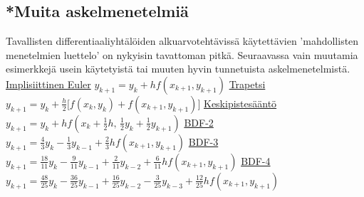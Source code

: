 \subsection{*Muita askelmenetelmiä}

Tavallisten differentiaaliyhtälöiden alkuarvotehtävissä käytettävien 'mahdollisten menetelmien
luettelo' on nykyisin tavattoman pitkä. Seuraavassa vain muutamia esimerkkejä usein käytetyistä
tai muuten hyvin tunnetuista askelmenetelmistä.
  
\vspace{5mm}\newline
\underline{Implisiittinen Euler} \vspace{2mm}\newline
$y_{k+1}=y_k+hf(x_{k+1},y_{k+1})$ \vspace{5mm}\newline
\underline{Trapetsi} \vspace{2mm}\newline
$y_{k+1}=y_k+\frac{h}{2}\bigl[f(x_k,y_k)+f(x_{k+1},y_{k+1})\bigr]$ \vspace{5mm}\newline
\underline{Keskipistesääntö} \vspace{2mm}\newline
$y_{k+1}=y_k+hf\left(x_k+\frac{1}{2}h,\,\frac{1}{2}y_k+\frac{1}{2}y_{k+1}\right)$
\vspace{5mm}\newline
\underline{BDF-2} \vspace{2mm}\newline
$y_{k+1}=\frac{4}{3}y_k-\frac{1}{3}y_{k-1}+\frac{2}{3}hf(x_{k+1},y_{k+1})$ \vspace{5mm}\newline
\underline{BDF-3} \vspace{2mm}\newline
$y_{k+1}=\frac{18}{11}y_k-\frac{9}{11}y_{k-1}+\frac{2}{11}y_{k-2}
                         +\frac{6}{11}hf(x_{k+1},y_{k+1})$ \vspace{5mm}\newline
\underline{BDF-4} \vspace{2mm}\newline
$y_{k+1}=\frac{48}{25}y_k-\frac{36}{25}y_{k-1}+\frac{16}{25}y_{k-2}-\frac{3}{25}y_{k-3}
                         +\frac{12}{25}hf(x_{k+1},y_{k+1})$ \vspace{5mm}\newline
